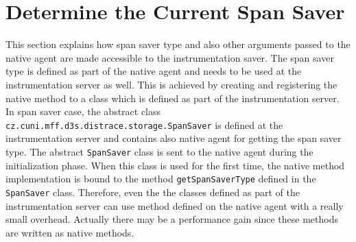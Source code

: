 \section{Determine the Current Span Saver}
This section explains how span saver type and also other arguments passed to the native agent are made accessible to the instrumentation saver. The span saver type is defined as part of the native agent and needs to be used at the instrumentation server as well. This is achieved by creating and registering the native method to a class which is defined as part of the instrumentation server.
In span saver case, the abstract class \texttt{cz.cuni.mff.d3s.distrace.storage.SpanSaver} is defined at the instrumentation server and contains also native agent for getting the span saver type. The abstract \texttt{SpanSaver} class is sent to the native agent during the initialization phase. When this class is used for the first time, the native method implementation is bound to the method \texttt{getSpanSaverType} defined in the \texttt{SpanSaver} class. Therefore, even the the classes defined as part of the instrumentation server can use method defined on the native agent with a really small overhead. Actually there may be a performance gain since these methods are written as native methods.




